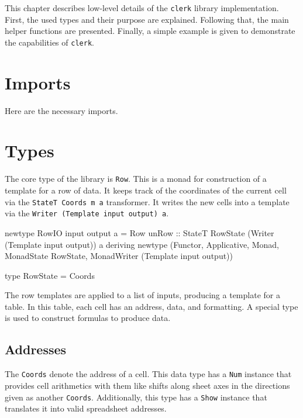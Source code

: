 
This chapter describes low-level details of the \texttt{clerk} library implementation. First, the used types and their purpose are explained. Following that, the main helper functions are presented. Finally, a simple example is given to demonstrate the capabilities of \texttt{clerk}.

\section{Imports}

Here are the necessary imports.



\section{Types}
\label{sec:types}

The core type of the library is \texttt{Row}. This is a monad for construction of a template for a row of data. It keeps track of the coordinates of the current cell via the \texttt{StateT Coords m a} transformer. It writes the new cells into a template via the \texttt{Writer (Template input output) a}.

\begin{mycode}
newtype RowIO input output a = Row
  {unRow :: StateT RowState (Writer (Template input output)) a}
  deriving newtype (Functor, Applicative, Monad, MonadState RowState, MonadWriter (Template input output))

type RowState = Coords
\end{mycode}

The row templates are applied to a list of inputs, producing a template for a table.
In this table, each cell has an address, data, and formatting. A special type is used to construct formulas to produce data.

\subsection{Addresses}
\label{sec:addresses}

The \texttt{Coords} denote the address of a cell. This data type has a \texttt{Num} instance that provides cell arithmetics with them like shifts along sheet axes in the directions given as another \texttt{Coords}. Additionally, this type has a \texttt{Show} instance that translates it into valid spreadsheet addresses.

